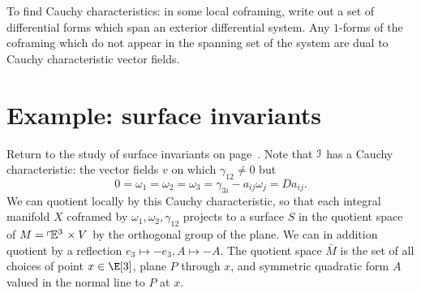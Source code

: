 To find Cauchy characteristics: in some local coframing, write out a set of differential forms which span an exterior differential system.
Any \(1\)-forms of the coframing which do not appear in the spanning set of the system are dual to Cauchy characteristic vector fields.

\section{Example: surface invariants}
Return to the study of surface invariants on page~.
Note that \(\mathcal{I}\) has a Cauchy characteristic: the vector fields \(v\) on which \(\gamma_{12} \ne 0\) but 
\[
0=\omega_1=\omega_2=\omega_3=\gamma_{3i}-a_{ij}\omega_j=Da_{ij}.
\]
We can quotient locally by this Cauchy characteristic, so that each integral manifold \(X\) coframed by \(\omega_1,\omega_2,\gamma_{12}\) projects to a surface \(S\) in the quotient space of \(M=\left\ulcorner\!\mathbb{E}^{3}\right. \times V\) by the orthogonal group of the plane.
We can in addition quotient by a reflection \(e_3\mapsto -e_3, A\mapsto -A\).
The quotient space \(\bar{M}\) is the set of all choices of point \(x \in \E[3]\), plane \(P\) through \(x\), and symmetric quadratic form \(A\) valued in the normal line to \(P\) at \(x\).

